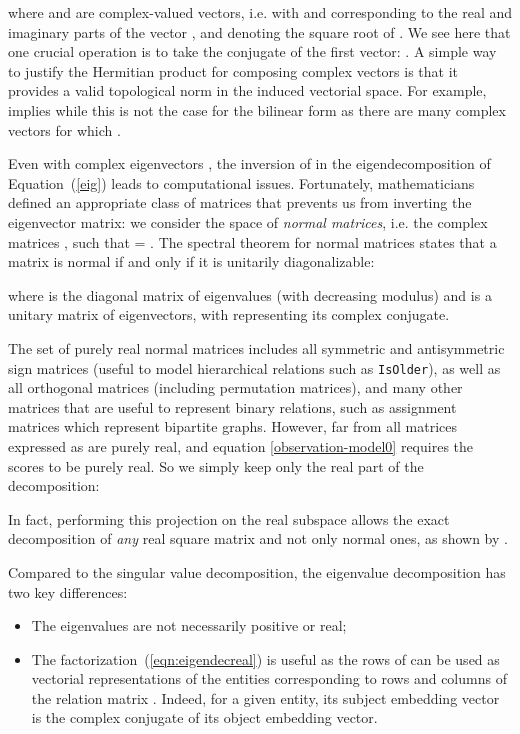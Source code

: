 \documentclass{article}
\def\tt{\texttt}
\begin{document}
where  and  are complex-valued vectors, i.e.  with  and  corresponding to the real and imaginary parts of the vector , and  denoting the square root of . We see here that one crucial operation is to take the conjugate of the first vector: .
A simple way to justify the Hermitian product for composing complex vectors is that it provides a valid topological norm in the induced vectorial space. For example,  implies  while this is not the case for the bilinear form  as there are many complex vectors for which . 

Even with complex eigenvectors , the inversion of  in the eigendecomposition of Equation~(\ref{eig}) leads to computational issues. Fortunately, mathematicians defined an appropriate class of matrices that prevents us from inverting the eigenvector matrix: we consider the space of \emph{normal matrices}, i.e. the complex  matrices , such that  = . The spectral theorem for normal matrices states that a matrix  is normal if and only if it is unitarily diagonalizable:

where  is the diagonal matrix of eigenvalues 
(with decreasing modulus) and  is a unitary matrix of 
eigenvectors, with  representing its complex conjugate. 

The set of purely real normal matrices includes all
 symmetric and antisymmetric sign matrices (useful to model hierarchical
relations such as \tt{IsOlder}), as well as 
all orthogonal matrices (including permutation matrices), and many other matrices that are useful to represent binary relations, such as assignment matrices which represent bipartite graphs. However, far from all matrices expressed as  are
purely real, and equation \ref{observation-model0} requires the scores  to be purely real. So we simply keep only the real part of the
decomposition:


In fact, performing this projection on the real subspace allows the exact
decomposition of \emph{any} real square matrix  and not only normal ones,
as shown by \citet{trouillon_unitdiag2016}.










Compared to the singular value decomposition, the eigenvalue decomposition has two key differences:
\begin{itemize}
    \item The eigenvalues are not necessarily positive or real;
    \item The factorization~(\ref{eqn:eigendecreal}) is useful as the rows of
     can be used as vectorial representations of the entities corresponding 
    to rows and columns of the relation matrix . Indeed, for a given entity, its subject embedding vector is the complex conjugate of its object embedding vector. 
\end{itemize}
\end{document}

